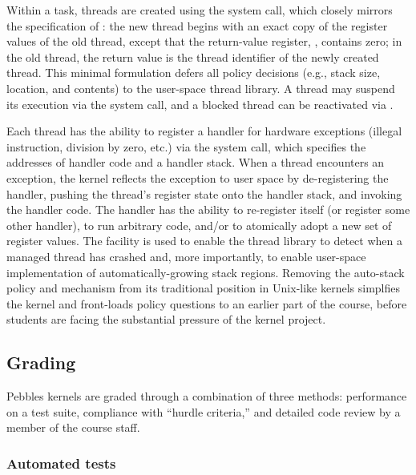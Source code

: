 Within a task, threads are created using the
 system call, which closely
mirrors the specification of :
the new thread begins with an exact copy of the
register values of the old thread, except that
the return-value register, , contains
zero;
in the old thread, the return value is the thread identifier
of the newly created thread.
This minimal formulation defers all policy decisions
(e.g., stack size, location, and contents) to the
user-space thread library.
A thread may suspend its execution via the
 system call,
and a blocked thread can be reactivated via
.

Each thread has the ability to register a handler
for hardware exceptions (illegal instruction,
division by zero, etc.)
via the  system call,
which specifies the addresses of handler code
and a handler stack.
When a thread encounters an exception,
the kernel reflects the exception to user space
by
de-registering the handler,
pushing the thread's register state onto the handler stack,
and invoking the handler code.
The handler has the ability to re-register itself
(or register some other handler),
to run arbitrary code,
and/or to atomically adopt a new set of register
values.
The  facility is used to enable
the thread library to detect when a managed
thread has crashed
and, more importantly,
to enable user-space
implementation of automatically-growing stack
regions.
Removing the auto-stack policy and mechanism from
its traditional position in Unix-like kernels
simplfies the kernel and
front-loads policy questions to an earlier
part of the course,
before students are facing the substantial pressure
of the kernel project.

\subsection{Grading}

Pebbles kernels are graded through a combination
of three methods:
performance on a test suite,
compliance with ``hurdle criteria,''
and detailed code review by a member of the course staff.

\subsubsection{Automated tests}

